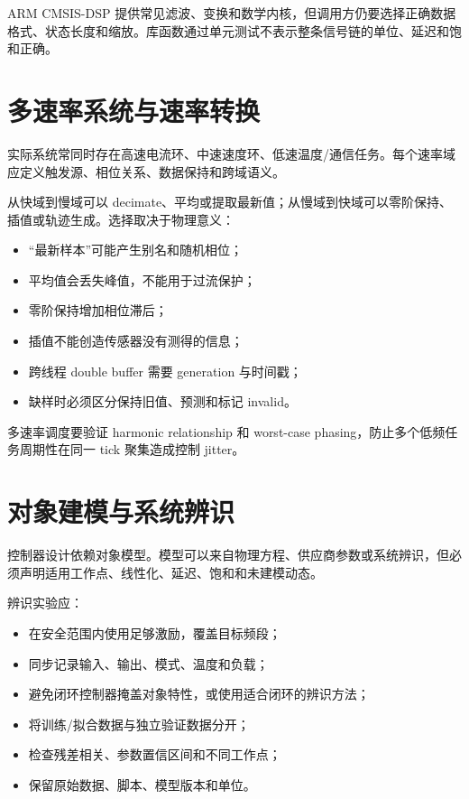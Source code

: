 ARM CMSIS-DSP 提供常见滤波、变换和数学内核，但调用方仍要选择正确数据格式、状态长度和缩放\cite{cmsis-dsp-doc}。库函数通过单元测试不表示整条信号链的单位、延迟和饱和正确。

\section{多速率系统与速率转换}

实际系统常同时存在高速电流环、中速速度环、低速温度/通信任务。每个速率域应定义触发源、相位关系、数据保持和跨域语义。

从快域到慢域可以 decimate、平均或提取最新值；从慢域到快域可以零阶保持、插值或轨迹生成。选择取决于物理意义：

\begin{itemize}
  \item “最新样本”可能产生别名和随机相位；
  \item 平均值会丢失峰值，不能用于过流保护；
  \item 零阶保持增加相位滞后；
  \item 插值不能创造传感器没有测得的信息；
  \item 跨线程 double buffer 需要 generation 与时间戳；
  \item 缺样时必须区分保持旧值、预测和标记 invalid。
\end{itemize}

多速率调度要验证 harmonic relationship 和 worst-case phasing，防止多个低频任务周期性在同一 tick 聚集造成控制 jitter。

\section{对象建模与系统辨识}

控制器设计依赖对象模型。模型可以来自物理方程、供应商参数或系统辨识，但必须声明适用工作点、线性化、延迟、饱和和未建模动态。

辨识实验应：

\begin{itemize}
  \item 在安全范围内使用足够激励，覆盖目标频段；
  \item 同步记录输入、输出、模式、温度和负载；
  \item 避免闭环控制器掩盖对象特性，或使用适合闭环的辨识方法；
  \item 将训练/拟合数据与独立验证数据分开；
  \item 检查残差相关、参数置信区间和不同工作点；
  \item 保留原始数据、脚本、模型版本和单位。
\end{itemize}

